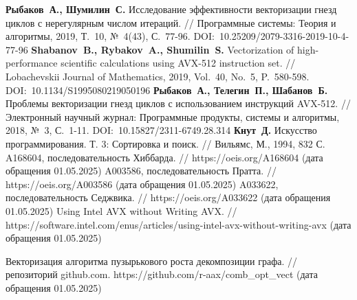 \begin{thebibliography}{99}
%
\textbf{Рыбаков~А., Шумилин~С.} Исследование эффективности векторизации гнезд циклов с нерегулярным числом итераций. // Программные системы: Теория и алгоритмы, 2019, Т.~10, №~4(43), С.~77-96. DOI:~10.25209/2079-3316-2019-10-4-77-96
%
\textbf{Shabanov~B., Rybakov~A., Shumilin~S.} Vectorization of high-performance scientific calculations using AVX-512 instruction set. // Lobachevskii Journal of Mathematics, 2019, Vol.~40, No.~5, P.~580-598. DOI:~10.1134/S1995080219050196
%
\textbf{Рыбаков~А., Телегин~П., Шабанов~Б.} Проблемы векторизации гнезд циклов с использованием инструкций AVX-512. // Электронный научный журнал: Программные продукты, системы и алгоритмы, 2018, №~3, С.~1-11. DOI:~10.15827/2311-6749.28.314
%
\textbf{Кнут~Д.} Искусство программирования. Т. 3: Сортировка и поиск. // Вильямс, М., 1994, 832 С.
%
A168604, последовательность Хиббарда. // https://oeis.org/A168604 (дата обращения 01.05.2025)
%
A003586, последовательность Пратта. // https://oeis.org/A003586 (дата обращения 01.05.2025)
%
A033622, последовательность Седжвика. // https://oeis.org/A033622 (дата обращения 01.05.2025)
%
Using Intel AVX without Writing AVX. // https://software.intel.com/enus/articles/using-intel-avx-without-writing-avx (дата обращения 01.05.2025)
%



%
Векторизация алгоритма пузырькового роста декомпозиции графа. // репозиторий github.com. https://github.com/r-aax/comb\_opt\_vect (дата обращения 01.05.2025)
%




\end{thebibliography}